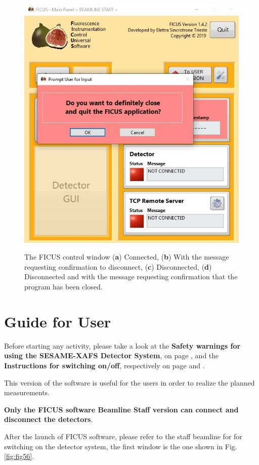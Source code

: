 \documentclass[a4paper,12pt,oneside,pdflatex,italian,final,twocolumn]{article}
\begin{document}
\begin{figure}[h]
\subfloat
{\includegraphics[width=.48\textwidth]{Cattura73.jpg}} \\
\caption{The FICUS control window (\textbf{a}) Connected, (\textbf{b}) With the message requesting confirmation to disconnect, (\textbf{c}) Disconnected, (\textbf{d}) Disconnected and with the message requesting confirmation that the program has been closed.}\label{fig:fig55}
\end{figure}


\clearpage

\section{Guide for User}

Before starting any activity, please take a look at the \textbf{Safety warnings for using the SESAME-XAFS Detector System}, on page \pageref{accensione}, and the \textbf{Instructions for switching on/off}, respectively on page \pageref{accensione} and \pageref{spegnimento}.

This version of the software is useful for the users in order to realize the planned measurements.

\textbf{Only the FICUS software Beamline Staff version can connect and disconnect the detectors}.

After the launch of FICUS software, please refer to the staff beamline for for switching on the detector system, the first window is the one shown in Fig. \ref{fig:fig56}.
\end{document}
